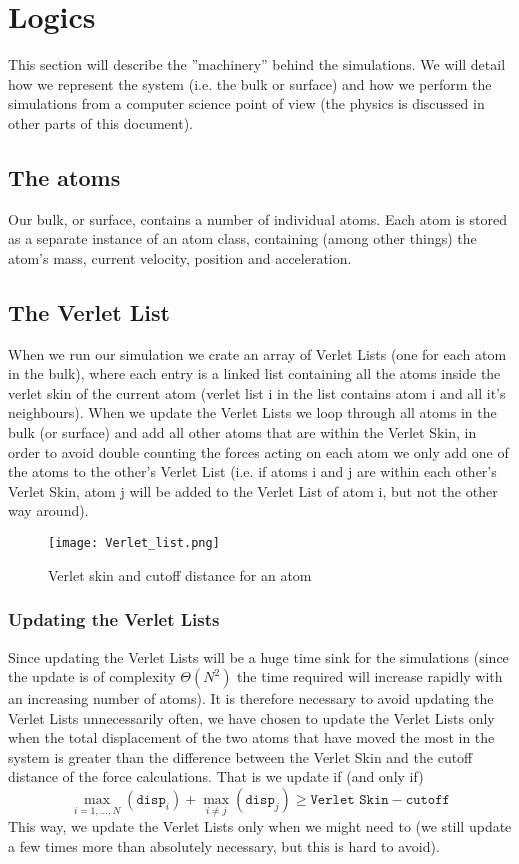 \section{Logics}
This section will describe the ''machinery'' behind the simulations. We will
detail how we represent the system (i.e. the bulk or surface) and how we perform
the simulations from a computer science point of view (the physics is discussed
in other parts of this document).
\subsection{The atoms}
Our bulk, or surface, contains a number of individual atoms. Each atom is stored
as a separate instance of an atom class, containing (among other things) the
atom's mass, current velocity, position and acceleration.
\subsection{The Verlet List}
When we run our simulation we crate an array of Verlet Lists (one for each atom
in the bulk), where each entry is a linked list containing all the atoms inside
the verlet skin of the current atom (verlet list i in the list contains atom i
and all it's neighbours). When we update the Verlet Lists we loop through all
atoms in the bulk (or surface) and add all other atoms that are within the
Verlet Skin, in order to avoid double counting the forces acting on each atom we
only add one of the atoms to the other's Verlet List (i.e. if atoms i and j are
within each other's Verlet Skin, atom j will be added to the Verlet List of atom
i, but not the other way around).
\begin{figure}
\centering
\texttt{[image: Verlet\_list.png]}
\caption{Verlet skin and cutoff distance for an atom}
\label{fig:verlet_list}
\end{figure}
\subsubsection{Updating the Verlet Lists}
Since updating the Verlet Lists will be a huge time sink for the simulations
(since the update is of complexity $\Theta(N^2)$ the time required will increase
rapidly with an increasing number of atoms). It is therefore necessary to avoid
updating the Verlet Lists unnecessarily often, we have chosen to update the
Verlet Lists only when the total displacement of the two atoms that have moved
the most in the system is greater than the difference between the Verlet Skin
and the cutoff distance of the force calculations.
That is we update if (and only if)
\[
\max_{i=1,\ldots,N}(\texttt{disp}_i) + \max_{i \neq j}(\texttt{disp}_j) \geq
\texttt{Verlet Skin} - \texttt{cutoff}
\]
This way, we update the Verlet Lists only when we might need to (we still update
a few times more than absolutely necessary, but this is hard to avoid).

